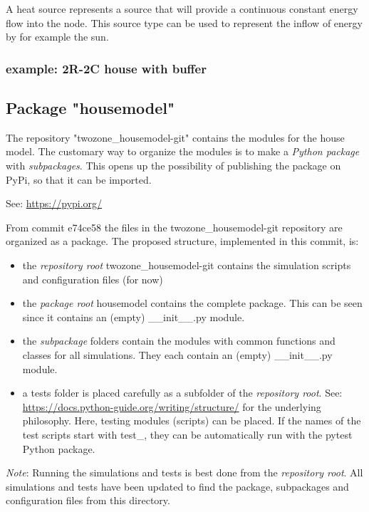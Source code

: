 A heat source represents a source that will provide a continuous constant energy flow into the node. This source type can be used to represent the inflow of energy by for example the sun. 

\subsubsection{example: 2R-2C house with buffer}

   


\subsection{Package "housemodel"}

The repository "\textsf{twozone\_housemodel-git}" contains the modules for the house model. The customary way to organize the modules is to make a \emph{Python package} with \emph{subpackages}. This opens up the possibility of publishing the package on PyPi, so that it can be imported.

See: \url{https://pypi.org/}

From commit \textsf{e74ce58} the files in the \textsf{twozone\_housemodel-git} repository are organized as a package. The proposed structure, implemented in this commit, is:


\begin{itemize}
	\item the \emph{repository root} \textsf{twozone\_housemodel-git} contains the simulation scripts and configuration files (for now) 
	\item the \emph{package root} \textsf{housemodel} contains the complete package. This can be seen since it contains an (empty) \textsf{\_\_init\_\_.py} module.
	\item the \emph{subpackage} folders contain the modules with common functions and classes for all simulations. They each contain an (empty) \textsf{\_\_init\_\_.py} module.
	\item a \textsf{tests} folder is placed carefully as a subfolder of the \emph{repository root}. 
	See: \url{https://docs.python-guide.org/writing/structure/} for the underlying philosophy. Here, testing modules (scripts) can be placed. If the names of the test scripts start with \textsf{test\_}, they can be automatically run with the \textsf{pytest} Python package.
\end{itemize}

\textit{Note}: Running the simulations and tests is best done from the \emph{repository root}. All simulations and tests have been updated to find the package, subpackages and configuration files from this directory.

\newpage